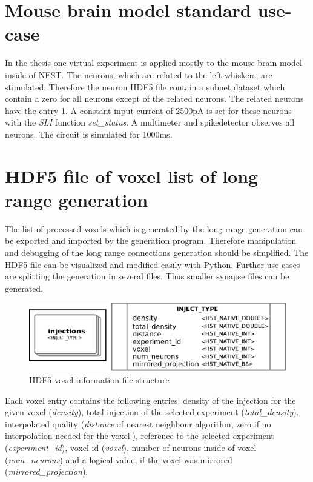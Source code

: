 \section{Mouse brain model standard use-case}
\label{ambmusecase}
In the thesis one virtual experiment is applied mostly to the mouse brain model inside of NEST.
The neurons, which are related to the left whiskers, are stimulated.
Therefore the neuron HDF5 file contain a subnet dataset which contain a zero
for all neurons except of the related neurons. The related neurons have the entry 1.
A constant input current of 2500pA is set for these neurons with the \emph{SLI} function \emph{set\_status}.
A multimeter and spikedetector observes all neurons.
The circuit is simulated for 1000ms.

\section{HDF5 file of voxel list of long range generation}
\label{file:voxelinfo}
The list of processed voxels which is generated by the long range generation can be exported and imported
by the generation program. Therefore manipulation and debugging of the long range connections generation should be
simplified. The HDF5 file can be visualized and modified easily with Python. Further use-cases are 
splitting the generation in several files. Thus smaller synapse files can be generated.

\begin{figure}[ht!]
\centering
\includegraphics[scale=0.6]{pictures/hdf5_voxel_format.eps}
\caption{HDF5 voxel information file structure}
\end{figure}

Each voxel entry contains the following entries: density of the injection for the given voxel (\emph{density}),
total injection of the selected experiment (\emph{total\_density}),
interpolated quality (\emph{distance} of nearest neighbour algorithm, zero if no interpolation needed for the voxel.),
reference to the selected experiment (\emph{experiment\_id}),
voxel id (\emph{voxel}),
number of neurons inside of voxel (\emph{num\_neurons}) and
a logical value, if the voxel was mirrored (\emph{mirrored\_projection}).



